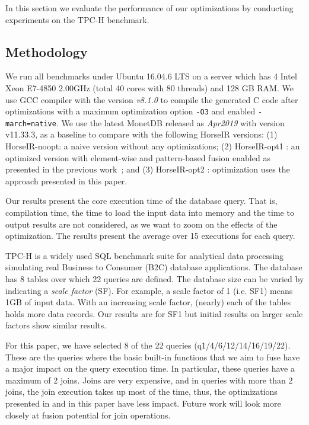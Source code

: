 In this section we evaluate the performance of our optimizations by conducting
experiments on the TPC-H benchmark. 

\subsection{Methodology}

We run all benchmarks under Ubuntu 16.04.6 LTS on a server which has 4 Intel
Xeon E7-4850 2.00GHz (total 40 cores with 80 threads) and 128 GB RAM.
We use GCC compiler with the version \textit{v8.1.0} to compile the generated C
code after optimizations with a maximum optimization option \texttt{-O3} and
enabled \texttt{-march=native}.
We use the latest MonetDB \cite{IdreosS2012} released as \textit{Apr2019} with
version v11.33.3, as a baseline to compare with the following HorseIR versions:
(1) HorseIR-noopt: a naive version without any optimizations;
(2) HorseIR-opt1 : an optimized version with element-wise and pattern-based
fusion enabled as presented in the previous work~\OldPaper; and
(3) HorseIR-opt2 : optimization uses the approach presented in this paper.

Our results present the core execution time of the database query. That is,
compilation time, the time to load the input data into memory and the time to
output results are not considered, as we want to zoom on the effects of the
optimization.  The results present the average over 15 executions for each
query.


TPC-H \cite{TPCH2017} is a widely used SQL benchmark suite for analytical data
processing simulating real Business to Consumer (B2C)
database applications. The database has 8 tables over which 22 queries are
defined.  The database size can be varied by indicating a  \textit{scale factor} (SF).
For example, a scale factor of 1 (i.e. SF1) means 1GB of input
data. With an increasing scale factor, (nearly) each of the tables holds more
data records. Our results are for SF1 but initial results on larger scale
factors show similar results.

For this paper, we have selected 8 of the 22 queries (q1/4/6/12/14/16/19/22).
These are the queries where the basic built-in functions that we aim to fuse
have a major impact on the query execution time. In particular, these queries
have a maximum of 2 joins. Joins are very expensive, and in queries with more
than 2 joins, the join execution takes up most of the time, thus, the
optimizations presented in \OldPaper and in this paper have less impact.
Future work will look more closely at fusion potential for join operations.  

